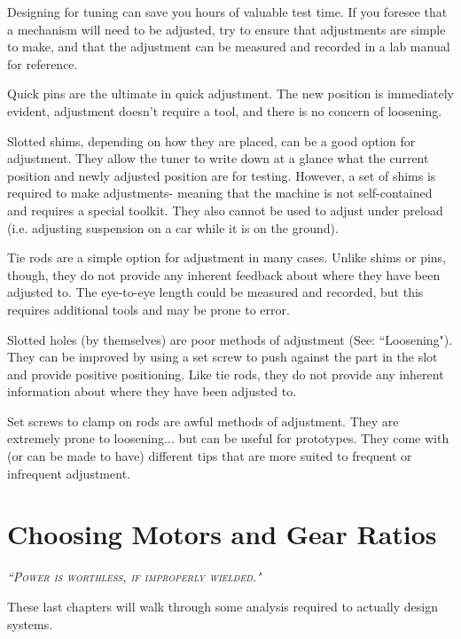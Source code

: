 Designing for tuning can save you hours of valuable test time. If you foresee that a mechanism will need to be adjusted, try to ensure that adjustments are simple to make, and that the adjustment can be measured and recorded in a lab manual for reference.
\begin{asparaitem}
	\item Quick pins are the ultimate in quick adjustment. The new position is immediately evident, adjustment doesn't require a tool, and there is no concern of loosening.
	\item Slotted shims, depending on how they are placed, can be a good option for adjustment. They allow the tuner to write down at a glance what the current position and newly adjusted position are for testing. However, a set of shims is required to make adjustments- meaning that the machine is not self-contained and requires a special toolkit. They also cannot be used to adjust under preload (i.e. adjusting suspension on a car while it is on the ground).
	\item Tie rods are a simple option for adjustment in many cases. Unlike shims or pins, though, they do not provide any inherent feedback about where they have been adjusted to. The eye-to-eye length could be measured and recorded, but this requires additional tools and may be prone to error.
	\item Slotted holes (by themselves) are poor methods of adjustment (See: ``Loosening"). They can be improved by using a set screw to push against the part in the slot and provide positive positioning. Like tie rods, they do not provide any inherent information about where they have been adjusted to.
	\item Set screws to clamp on rods are awful methods of adjustment. They are extremely prone to loosening... but can be useful for prototypes. They come with (or can be made to have) different tips that are more suited to frequent or infrequent adjustment.
\end{asparaitem}

\chapter{Choosing Motors and Gear Ratios}

 {\slshape \scshape ``Power is worthless, if improperly wielded."}
 
These last chapters will walk through some analysis required to actually design systems.

